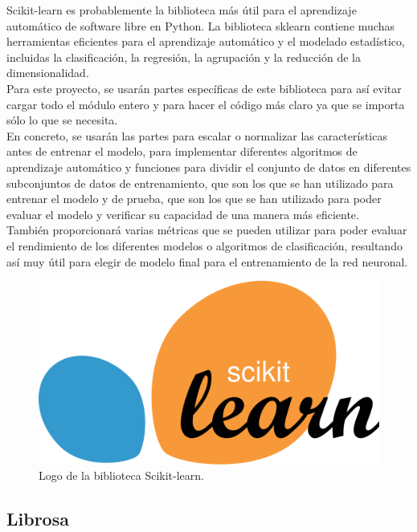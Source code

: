 Scikit-learn es probablemente la biblioteca más útil para el aprendizaje automático de software libre en Python. La biblioteca sklearn contiene muchas herramientas eficientes para el aprendizaje automático y el modelado estadístico, incluidas la clasificación, la regresión, la agrupación y la reducción de la dimensionalidad.\\ Para este proyecto, se usarán partes específicas de este biblioteca para así evitar cargar todo el módulo entero y para hacer el código más claro ya que se importa sólo lo que se necesita. \\

En concreto, se usarán las partes para escalar o normalizar las características antes de entrenar el modelo, para implementar diferentes algoritmos de aprendizaje automático y funciones para dividir el conjunto de datos en diferentes subconjuntos de datos de entrenamiento, que son los que se han utilizado para entrenar el modelo y de prueba, que son los que se han utilizado para poder evaluar el modelo y verificar su capacidad de una manera más eficiente.\\

También proporcionará varias métricas que se pueden utilizar para poder evaluar el rendimiento de los diferentes modelos o algoritmos de clasificación, resultando así muy útil para elegir de modelo final para el entrenamiento de la red neuronal.

\begin{figure}[H]
  \centering
  \includegraphics[scale=0.1]{figs/sklearn} %
  \caption{Logo de la biblioteca Scikit-learn.}
  \label{fig:sklearn}
\end{figure}

\subsection{Librosa}
\label{subsec:librosa}

